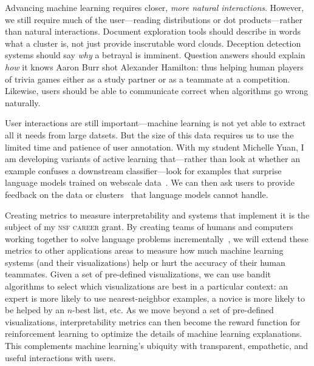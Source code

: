 \documentclass[11pt]{amsart}
\begin{document}
Advancing machine learning requires closer, \emph{more natural interactions}.
However, we still require much of the user---reading distributions or dot
products---rather than natural interactions. Document exploration tools should
describe in words what a cluster is, not just provide inscrutable word clouds.
Deception detection systems should say \emph{why} a betrayal is imminent.
Question answers should explain \emph{how} it knows Aaron Burr shot Alexander
Hamilton: thus helping human players of trivia games either as a study partner
or as a teammate at a competition. Likewise, users should be able to
communicate correct when algorithms go wrong naturally.

User interactions are still important---machine learning is not yet able to
extract all it needs from large datsets. But the size of this data requires us
to use the limited time and patience of user annotation. With my
student Michelle Yuan, I am developing
variants of active learning that---rather than look at whether an example
confuses a downstream classifier---look for examples that surprise language
models trained on webscale data~\cite{devlin-19}. We can then ask users to
provide feedback on the data or clusters~\cite{poursabzi-16} that language
models cannot handle.

Creating metrics to measure interpretability and systems that implement it is
the subject of my \textsc{nsf career} grant. By creating teams of humans and
computers working together to solve language problems
incrementally~\cite{feng-19}, we will extend these metrics to other
applications areas to measure how much machine learning systems (and their
visualizations) help or hurt the accuracy of their human teammates. Given a set
of pre-defined visualizations, we can use bandit algorithms to select which
visualizations are best in a particular context: an expert is more likely to
use nearest-neighbor examples, a novice is more likely to be helped by an
$n$-best list, etc. As we move beyond a set of pre-defined visualizations,
interpretability metrics can then become the reward function for reinforcement
learning to optimize the details of machine learning explanations. This
complements machine learning's ubiquity with transparent, empathetic, and
useful interactions with users.




\end{document}

